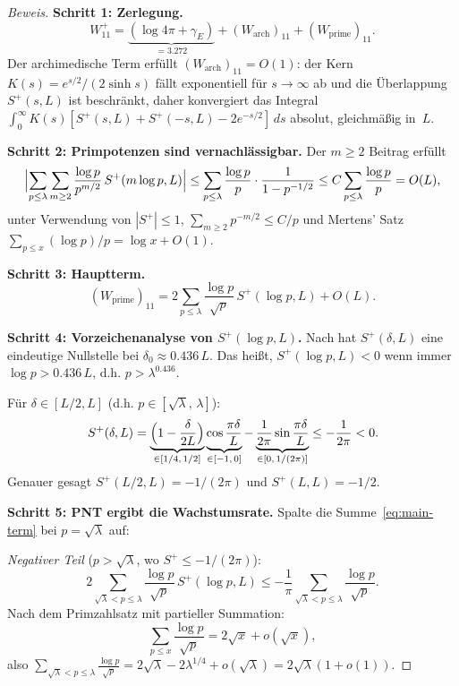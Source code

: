 \documentclass[12pt,a4paper]{article}
\theoremstyle{definition}
\theoremstyle{remark}
\begin{document}
\begin{proof}[Beweis]
\textbf{Schritt 1: Zerlegung.}
\[
  W_{11}^+ = \underbrace{(\log 4\pi + \gamma_E)}_{= 3.272} + (W_{\mathrm{arch}})_{11} + (W_{\mathrm{prime}})_{11}.
\]
Der archimedische Term erfüllt $(W_{\mathrm{arch}})_{11} = O(1)$: der Kern $K(s) = e^{s/2}/(2\sinh s)$ fällt exponentiell für $s \to \infty$ ab und die Überlappung $S^+(s, L)$ ist beschränkt, daher konvergiert das Integral $\int_0^{\infty} K(s)[S^+(s,L) + S^+(-s,L) - 2e^{-s/2}]\,ds$ absolut, gleichmäßig in~$L$.

\medskip\noindent\textbf{Schritt 2: Primpotenzen sind vernachlässigbar.}
Der $m \geq 2$ Beitrag erfüllt
\[
  \Bigl|\sum_{p \leq \lambda}\sum_{m \geq 2} \frac{\log p}{p^{m/2}}\,S^+(m\log p, L)\Bigr|
  \leq \sum_{p \leq \lambda} \frac{\log p}{p}\cdot\frac{1}{1 - p^{-1/2}}
  \leq C\sum_{p \leq \lambda}\frac{\log p}{p} = O(L),
\]
unter Verwendung von $|S^+| \leq 1$, $\sum_{m \geq 2} p^{-m/2} \leq C/p$ und Mertens' Satz $\sum_{p \leq x} (\log p)/p = \log x + O(1)$.

\medskip\noindent\textbf{Schritt 3: Hauptterm.}
\begin{equation}
\label{eq:main-term}
  (W_{\mathrm{prime}})_{11} = 2\sum_{p \leq \lambda}\frac{\log p}{\sqrt{p}}\,S^+(\log p, L) + O(L).
\end{equation}

\medskip\noindent\textbf{Schritt 4: Vorzeichenanalyse von $S^+(\log p, L)$.}
Nach  hat $S^+(\delta, L)$ eine eindeutige Nullstelle bei $\delta_0 \approx 0.436\,L$. Das heißt, $S^+(\log p, L) < 0$ wenn immer $\log p > 0.436\,L$, d.h. $p > \lambda^{0.436}$.

Für $\delta \in [L/2, L]$ (d.h. $p \in [\sqrt{\lambda},\,\lambda]$):
\[
  S^+(\delta, L) = \underbrace{\Bigl(1 - \frac{\delta}{2L}\Bigr)}_{\in [1/4,\,1/2]}
  \underbrace{\cos\frac{\pi\delta}{L}}_{\in [-1,\,0]}
  - \underbrace{\frac{1}{2\pi}\sin\frac{\pi\delta}{L}}_{\in [0,\,1/(2\pi)]}
  \leq -\frac{1}{2\pi} < 0.
\]
Genauer gesagt $S^+(L/2, L) = -1/(2\pi)$ und $S^+(L, L) = -1/2$.

\medskip\noindent\textbf{Schritt 5: PNT ergibt die Wachstumsrate.}
Spalte die Summe~\eqref{eq:main-term} bei $p = \sqrt{\lambda}$ auf:

\emph{Negativer Teil} ($p > \sqrt{\lambda}$, wo $S^+ \leq -1/(2\pi)$):
\[
  2\sum_{\sqrt{\lambda} < p \leq \lambda}\frac{\log p}{\sqrt{p}}\,S^+(\log p, L)
  \leq -\frac{1}{\pi}\sum_{\sqrt{\lambda} < p \leq \lambda}\frac{\log p}{\sqrt{p}}.
\]
Nach dem Primzahlsatz mit partieller Summation:
\[
  \sum_{p \leq x}\frac{\log p}{\sqrt{p}} = 2\sqrt{x} + o(\sqrt{x}),
\]
also $\displaystyle\sum_{\sqrt{\lambda} < p \leq \lambda}\frac{\log p}{\sqrt{p}} = 2\sqrt{\lambda} - 2\lambda^{1/4} + o(\sqrt{\lambda}) = 2\sqrt{\lambda}(1 + o(1))$.


\end{proof}
\end{document}
